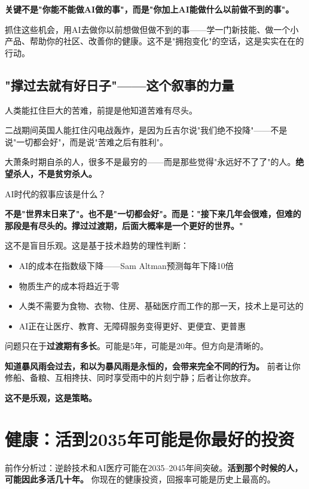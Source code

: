 \documentclass[a4paper,12pt,UTF8]{ctexart}
\begin{document}
\textbf{关键不是"你能不能做AI做的事"，而是"你加上AI能做什么以前做不到的事"。}

抓住这些机会，用AI去做你以前想做但做不到的事——学一门新技能、做一个小产品、帮助你的社区、改善你的健康。这不是"拥抱变化"的空话，这是实实在在的行动。

\subsection{"撑过去就有好日子"——这个叙事的力量}

人类能扛住巨大的苦难，前提是他知道苦难有尽头。

二战期间英国人能扛住闪电战轰炸，是因为丘吉尔说"我们绝不投降"——不是说"一切都会好"，而是说"苦难之后有胜利"。

大萧条时期自杀的人，很多不是最穷的——而是那些觉得"永远好不了了"的人。\textbf{绝望杀人，不是贫穷杀人。}

AI时代的叙事应该是什么？

\textbf{不是"世界末日来了"。也不是"一切都会好"。而是："接下来几年会很难，但难的那段是有尽头的。撑过过渡期，后面大概率是一个更好的世界。"}

这不是盲目乐观。这是基于技术趋势的理性判断：
\begin{itemize}
\item AI的成本在指数级下降——Sam Altman预测每年下降10倍
\item 物质生产的成本将趋近于零
\item 人类不需要为食物、衣物、住房、基础医疗而工作的那一天，技术上是可达的
\item AI正在让医疗、教育、无障碍服务变得更好、更便宜、更普惠
\end{itemize}

问题只在于\textbf{过渡期有多长}。可能是5年，可能是20年。但方向是清晰的。

\textbf{知道暴风雨会过去，和以为暴风雨是永恒的，会带来完全不同的行为。} 前者让你修船、备粮、互相搀扶、同时享受雨中的片刻宁静；后者让你放弃。

\textbf{这不是乐观，这是策略。}

\section{健康：活到2035年可能是你最好的投资}

前作分析过：逆龄技术和AI医疗可能在2035--2045年间突破。\textbf{活到那个时候的人，可能因此多活几十年。} 你现在的健康投资，回报率可能是历史上最高的。
\end{document}
